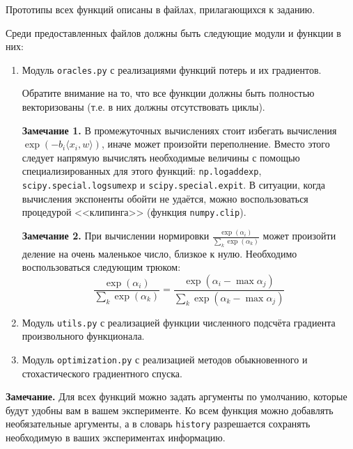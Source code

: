 \documentclass[10pt,fleqn]{article}
\begin{document}

Прототипы всех функций описаны в файлах, прилагающихся к заданию.

Среди предоставленных файлов должны быть следующие модули и функции в них:

\begin{enumerate}

\item Модуль \texttt{oracles.py} с реализациями функций потерь и их градиентов.

 Обратите внимание на то, что все функции должны быть полностью векторизованы (т.е. в них должны отсутствовать циклы).

\textbf{Замечание 1.} В промежуточных вычислениях стоит избегать вычисления $\exp(-b_i \langle x_i , w\rangle)$, иначе может произойти переполнение. Вместо этого следует напрямую вычислять необходимые величины с помощью специализированных для этого функций: \texttt{np.logaddexp}, \texttt{scipy.special.logsumexp} и \texttt{scipy.special.expit}.
В ситуации, когда вычисления экспоненты обойти не удаётся, можно воспользоваться процедурой <<клипинга>> (функция \texttt{numpy.clip}).

\textbf{Замечание 2.} При вычислении нормировки $\frac{\exp(\alpha_i)}{\sum_{k}\exp(\alpha_k)}$ может произойти деление на очень маленькое число, близкое к нулю. Необходимо воспользоваться следующим трюком:
$$
\frac{\exp(\alpha_i)}{\sum_{k}\exp(\alpha_k)} = \frac{\exp(\alpha_i - \max \alpha_j)}{\sum_{k}\exp(\alpha_k - \max \alpha_j)}
$$

\item Модуль \texttt{utils.py} с реализацией функции численного подсчёта градиента произвольного функционала.

\item Модуль \texttt{optimization.py} с реализацией методов обыкновенного и стохастического градиентного спуска.

\end{enumerate}

\textbf{Замечание.} Для всех функций можно задать аргументы по умолчанию, которые будут удобны вам в вашем эксперименте.
Ко всем функция можно добавлять необязательные аргументы, а в словарь \texttt{history} разрешается сохранять необходимую в ваших экспериментах информацию.
\end{document}
